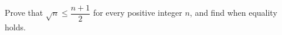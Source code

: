 Prove that $\sqrt n\le\dfrac{n+1}{2}$ for every positive integer $n$, and find when equality holds.
